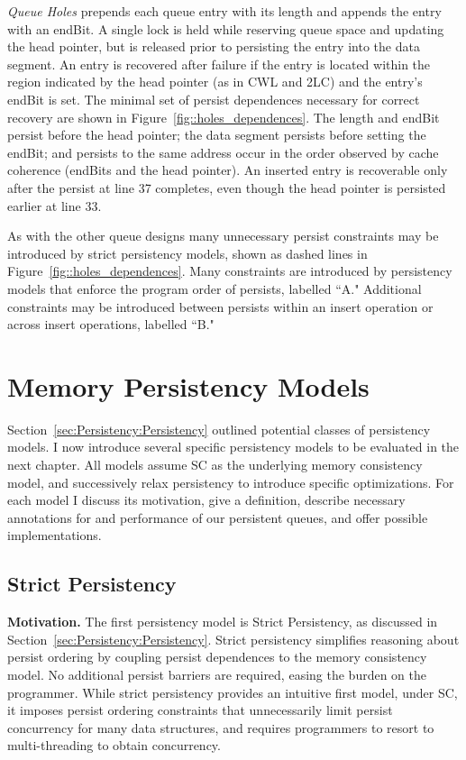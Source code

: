 

\emph{Queue Holes} prepends each queue entry with its length and appends the entry with an endBit.
A single lock is held while reserving queue space and updating the head pointer, but is released prior to persisting the entry into the data segment.
An entry is recovered after failure if the entry is located within the region indicated by the head pointer (as in CWL and 2LC) and the entry's endBit is set.
The minimal set of persist dependences necessary for correct recovery are shown in Figure~\ref{fig::holes_dependences}.
The length and endBit persist before the head pointer; the data segment persists before setting the endBit; and persists to the same address occur in the order observed by cache coherence (endBits and the head pointer).
An inserted entry is recoverable only after the persist at line 37 completes, even though the head pointer is persisted earlier at line 33.

As with the other queue designs many unnecessary persist constraints may be introduced by strict persistency models, shown as dashed lines in Figure~\ref{fig::holes_dependences}.
Many constraints are introduced by persistency models that enforce the program order of persists, labelled ``A."
Additional constraints may be introduced between persists within an insert operation or across insert operations, labelled ``B."

\section{Memory Persistency Models}
\label{sec:PersistencyModels:Models}

Section~\ref{sec:Persistency:Persistency} outlined potential classes of persistency models.
I now introduce several specific persistency models to be evaluated in the next chapter.
All models assume SC as the underlying memory consistency model, and successively relax persistency to introduce specific optimizations.
For each model I discuss its motivation, give a definition, describe necessary annotations for and performance of our persistent queues, and offer possible implementations.

\subsection{Strict Persistency}
\label{section:PersistencyModels:Strict}

\textbf{Motivation.}
The first persistency model is Strict Persistency, as discussed in Section~\ref{sec:Persistency:Persistency}.
Strict persistency simplifies reasoning about persist ordering by coupling persist dependences to the memory consistency model.
No additional persist barriers are required, easing the burden on the programmer.
While strict persistency provides an intuitive first model, under SC, it imposes persist ordering constraints that unnecessarily limit persist concurrency for many data structures, and requires programmers to resort to multi-threading to obtain concurrency.

